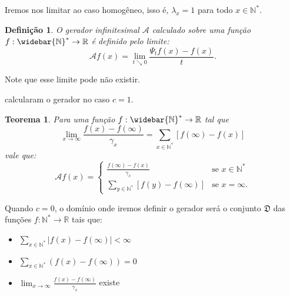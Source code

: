 \documentclass[xcolor=pdftex,dvipsnames]{beamer}
\newcommand{\AAA}{{\mathcal{A}}}
\newcommand{\DDD}{{\mathfrak{D}}}
\newcommand{\Nz}{{\mathbb{N^*}}}
\newcommand{\Nzb}{{\mathbb{\widebar{N}^*}}}
\newcommand{\R}{{\mathbb{R}}}
\newtheorem{teorema}{Teorema}
\newtheorem{definicao}{Definição}
\begin{document}
\begin{frame}

  Iremos nos limitar ao caso homogêneo, isso é, $\lambda_x = 1$ para
  todo $x \in \Nz$.

  \begin{definicao}
    O gerador infinitesimal $\AAA$ calculado sobre uma função $f: \Nzb
    \to \R$ é definido pelo limite:
    \begin{displaymath}
      \AAA f (x) = \lim_{t \searrow 0} \frac{\Psi_t f (x) - f(x)}{t}.
    \end{displaymath}
  \end{definicao}
  
  Note que esse limite pode não existir.

\end{frame}  


\begin{frame}
  \cite{kendall:56} calcularam o gerador no caso $c = 1$.

  \begin{teorema}
  Para uma função $f: \Nzb \to \R$ tal que
  \begin{displaymath}
    \lim_{x \to \infty}
    \frac{f(x) - f(\infty)}{\gamma_x} = \sum_{x \in \Nz}
    [f(\infty) - f(x)]
  \end{displaymath}
  vale que:
  \begin{displaymath}
    \AAA f (x) = \begin{cases}
      \displaystyle
      \frac{f(\infty) - f(x)}{\gamma_x} & \text{se } x \in \Nz\\
      \displaystyle
      \sum_{y\in \Nz} [f(y) - f(\infty)] & \text{se } x = \infty.
    \end{cases}
  \end{displaymath}
\end{teorema}
\end{frame}

\begin{frame}

  Quando $c = 0$, o domínio onde iremos definir o gerador será 
  o conjunto $\DDD$ das funções $f: \Nz \to \R$ tais que:

  \begin{itemize}
  \item $\displaystyle \sum_{x\in \Nz} |f(x)-f(\infty)| < \infty$
  \item $\displaystyle \sum_{x\in \Nz} \left( f(x)-f(\infty)\right) = 0$
  \item $\displaystyle \lim_{x \to \infty} \frac{f(x) -
      f(\infty)}{\gamma_x}$ existe
  \end{itemize}  
\end{frame}
\end{document}
